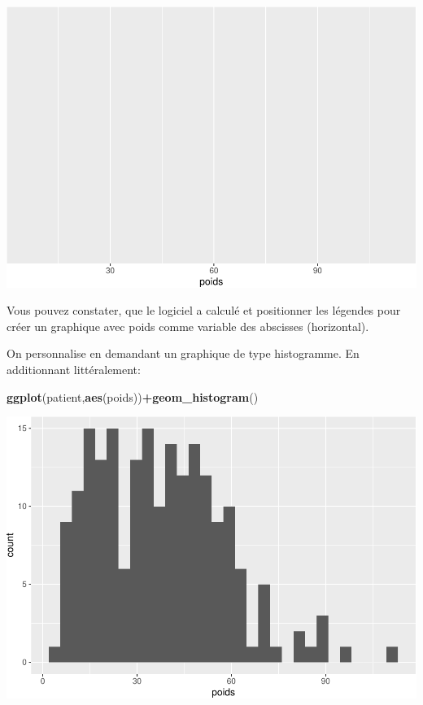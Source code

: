 \documentclass[
]{book}
\newenvironment{Shaded}{\begin{snugshade}}{\end{snugshade}}
\newcommand{\FunctionTok}[1]{\textcolor[rgb]{0.13,0.29,0.53}{\textbf{#1}}}
\newcommand{\NormalTok}[1]{#1}
\newcommand{\SpecialCharTok}[1]{\textcolor[rgb]{0.81,0.36,0.00}{\textbf{#1}}}
\begin{document}
\includegraphics{_main_files/figure-latex/ggplot2-1.pdf}

Vous pouvez constater, que le logiciel a calculé et positionner les légendes
pour créer un graphique avec poids comme variable des abscisses (horizontal).

On personnalise en demandant un graphique de type histogramme. En additionnant
littéralement:

\begin{Shaded}
\begin{Highlighting}[]
\FunctionTok{ggplot}\NormalTok{(patient,}\FunctionTok{aes}\NormalTok{(poids))}\SpecialCharTok{+}\FunctionTok{geom\_histogram}\NormalTok{()}
\end{Highlighting}
\end{Shaded}

\includegraphics{_main_files/figure-latex/ggplot3-1.pdf}
\end{document}
